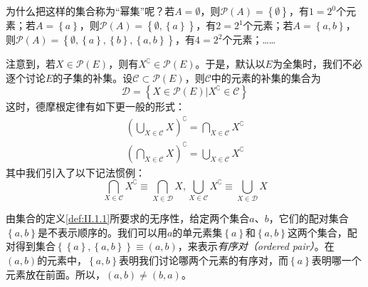 \documentclass[../main.tex]{subfiles}
\begin{document}
为什么把这样的集合称为“幂集”呢？若$A=\emptyset$，则$\mathcal{P}\left(A\right)=\left\{\emptyset\right\}$，有$1=2^0$个元素；若$A=\left\{a\right\}$，则$\mathcal{P}\left(A\right)=\left\{\emptyset,\left\{a\right\}\right\}$，有$2=2^1$个元素；若$A=\left\{a,b\right\}$，则$\mathcal{P}\left(A\right)=\left\{\emptyset,\left\{a\right\},\left\{b\right\},\left\{a,b\right\}\right\}$，有$4=2^2$个元素；……

注意到，若$X\in\mathcal{P}\left(E\right)$，则有$X^\complement\in\mathcal{P}\left(E\right)$。于是，默认以$E$为全集时，我们不必逐个讨论$E$的子集的补集。设$\mathcal{C}\subset\mathcal{P}\left(E\right)$，则$\mathcal{C}$中的元素的补集的集合为
\[
    \mathcal{D}=\left\{X\in\mathcal{P}\left(E\right)|X^\complement\in\mathcal{C}\right\}
\]
这时，德摩根定律有如下更一般的形式：
\begin{align*}
    \left(\bigcup_{X\in\mathcal{C}}X\right)^\complement=\bigcap_{X\in\mathcal{C}}X^\complement \\
    \left(\bigcap_{X\in\mathcal{C}}X\right)^\complement=\bigcup_{X\in\mathcal{C}}X^\complement
\end{align*}
其中我们引入了以下记法惯例：
\[
    \bigcap_{X\in\mathcal{C}}X^\complement\equiv\bigcap_{X\in\mathcal{D}}X, \bigcup_{X\in\mathcal{C}}X^\complement\equiv\bigcup_{X\in\mathcal{D}}X
\]

由集合的定义\ref{def:II.1.1}所要求的无序性，给定两个集合$a$、$b$，它们的配对集合$\left\{a,b\right\}$是不表示顺序的。我们可以用$a$的单元素集$\left\{a\right\}$和$\left\{a,b\right\}$这两个集合，配对得到集合$\left\{\left\{a\right\},\left\{a,b\right\}\right\}\equiv\left(a,b\right)$，来表示\emph{有序对（ordered pair）}。在$\left(a,b\right)$的元素中，$\left\{a,b\right\}$表明我们讨论哪两个元素的有序对，而$\left\{a\right\}$表明哪一个元素放在前面。所以，$\left(a,b\right)\neq\left(b,a\right)$。
\end{document}
